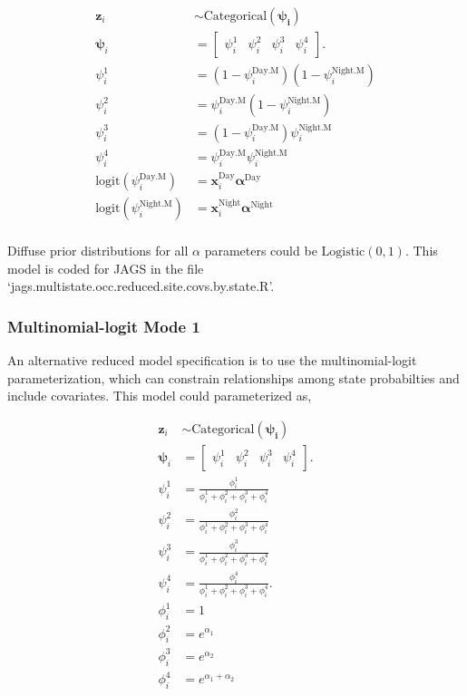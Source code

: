 \documentclass[12pt]{article}
\begin{document}
\begin{center}
\begin{align*}
\textbf{z}_{i} &\sim \text{Categorical}(\boldsymbol{\psi_{i}})\\
\boldsymbol{\psi}_{i} &= \begin{bmatrix} \psi^1_{i} & \psi^2_{i} & \psi^3_{i} & \psi^4_{i} \end{bmatrix}.\\
\psi^1_{i} &=(1-\psi^{\text{Day.M}}_{i})(1-\psi^{\text{Night.M}}_{i})\\%
\psi^2_{i} &=\psi^{\text{Day.M}}_{i}(1-\psi^{\text{Night.M}}_{i})\\
\psi^3_{i} &=(1-\psi^{\text{Day.M}}_{i})\psi^{\text{Night.M}}_{i}\\
\psi^4_{i} &=\psi^{\text{Day.M}}_{i}\psi^{\text{Night.M}}_{i}\\
\text{logit}(\psi^{\text{Day.M}}_{i}) &= \textbf{x}_{i}^{\text{Day}}\boldsymbol{\alpha}^{\text{Day}}\\
\text{logit}(\psi^{\text{Night.M}}_{i}) &= \textbf{x}_{i}^{\text{Night}}\boldsymbol{\alpha}^{\text{Night}}\\
\end{align*}
\end{center}
Diffuse prior distributions for all $\alpha$ parameters could be $\text{Logistic}(0,1)$. This model is coded for JAGS in the file `jags.multistate.occ.reduced.site.covs.by.state.R'.

\subsubsection{Multinomial-logit Mode 1}
An alternative reduced model specification is to use the multinomial-logit parameterization, which can constrain relationships among state probabilties and include covariates. This model could parameterized as, 
\begin{center}
\begin{align*}
\textbf{z}_{i} &\sim \text{Categorical}(\boldsymbol{\psi_{i}})\\
\boldsymbol{\psi}_{i} &= \begin{bmatrix} \psi^1_{i} & \psi^2_{i} & \psi^3_{i} & \psi^4_{i} \end{bmatrix}.\\
\psi^1_{i} &=\frac{\phi^1_{i}}{\phi^1_{i}+ \phi^2_{i}+\phi^3_{i}+\phi^4_{i}}\\
\psi^2_{i} &=\frac{\phi^2_{i}}{\phi^1_{i}+ \phi^2_{i}+\phi^3_{i}+\phi^4_{i}}\\
\psi^3_{i} &=\frac{\phi^3_{i}}{\phi^1_{i}+ \phi^2_{i}+\phi^3_{i}+\phi^4_{i}}\\
\psi^4_{i} &=\frac{\phi^4_{i}}{\phi^1_{i}+ \phi^2_{i}+\phi^3_{i}+\phi^4_{i}}.\\
\phi^1_{i} &= 1\\
\phi^2_{i} &= e^{\alpha_{1}}\\
\phi^3_{i} &= e^{\alpha_{2}}\\
\phi^4_{i} &= e^{\alpha_{1}+\alpha_{2}}\\
\end{align*}
\end{center}
\end{document}

